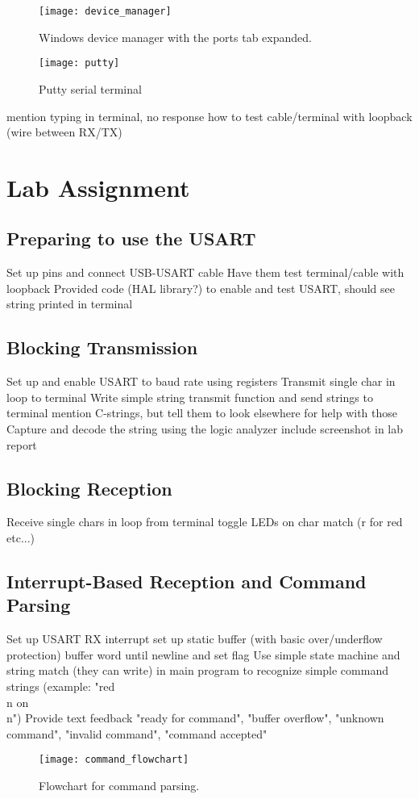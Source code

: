 \documentclass[11pt,fleqn]{book} %
\begin{document}
\begin{figure}[]
    \centering\texttt{[image: device\_manager]}
    \caption{Windows device manager with the ports tab expanded.}
    \label{device_manager}
\end{figure}
\begin{figure}[]
    \centering\texttt{[image: putty]}
    \caption{Putty serial terminal}
    \label{putty}
\end{figure}
mention typing in terminal, no response
how to test cable/terminal with loopback (wire between RX/TX)

\section{Lab Assignment}
\subsection{Preparing to use the USART} 
Set up pins and connect USB-USART cable
Have them test terminal/cable with loopback
Provided code (HAL library?) to enable and test USART, should see string printed in terminal
\subsection{Blocking Transmission}	
Set up and enable USART to baud rate using registers
Transmit single char in loop to terminal
Write simple string transmit function and send strings to terminal 
mention C-strings, but tell them to look elsewhere for help with those
Capture and decode the string using the logic analyzer
include screenshot in lab report
\subsection{Blocking Reception}			
Receive single chars in loop from terminal
toggle LEDs on char match (r for red etc...)
\subsection{Interrupt-Based Reception and Command Parsing}	
Set up USART RX interrupt
set up static buffer (with basic over/underflow protection)
buffer word until newline and set flag
Use simple state machine and string match (they can write) in main program to recognize simple command strings (example: "red \\n on \\n")
Provide text feedback "ready for command", "buffer overflow", "unknown command", "invalid command", "command accepted"
\begin{figure}[]
    \centering\texttt{[image: command\_flowchart]}
    \caption{Flowchart for command parsing.}
    \label{command_flowchart}
\end{figure}
\end{document}
